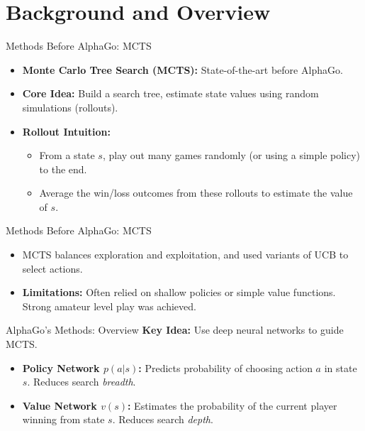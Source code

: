 \documentclass{beamer}
\begin{document}
\section{Background and Overview}
\begin{frame}{Methods Before AlphaGo: MCTS}
    \begin{itemize}
        \item \textbf{Monte Carlo Tree Search (MCTS):} State-of-the-art before AlphaGo.
        \item \textbf{Core Idea:} Build a search tree, estimate state values using random simulations (rollouts).
        \item \textbf{Rollout Intuition:}
        \begin{itemize}
            \item From a state $s$, play out many games randomly (or using a simple policy) to the end.
            \item Average the win/loss outcomes from these rollouts to estimate the value of $s$.
        \end{itemize}
    \end{itemize}
\end{frame}

\begin{frame}{Methods Before AlphaGo: MCTS}
    \begin{itemize}
        \item MCTS balances exploration and exploitation, and used variants of UCB to select actions.
        \item \textbf{Limitations:} Often relied on shallow policies or simple value functions. Strong amateur level play was achieved.
    \end{itemize}
\end{frame}

\begin{frame}{AlphaGo's Methods: Overview}
    \textbf{Key Idea:} Use deep neural networks to guide MCTS.
    \vspace{2ex}
    \begin{itemize}
        \item \textbf{Policy Network $p(a|s)$:} Predicts probability of choosing action $a$ in state $s$. Reduces search \textit{breadth}.
        \item \textbf{Value Network $v(s)$:} Estimates the probability of the current player winning from state $s$. Reduces search \textit{depth}.
    \end{itemize}
\end{frame}
\end{document}
